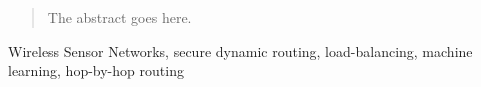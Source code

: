 \documentclass[journal]{IEEEtran}
\begin{document}







\maketitle


\begin{abstract}
The abstract goes here.
\end{abstract}

\begin{IEEEkeywords}
Wireless Sensor Networks, secure dynamic routing, load-balancing, machine learning, hop-by-hop routing 
\end{IEEEkeywords}






%
\IEEEpeerreviewmaketitle
\end{document}
